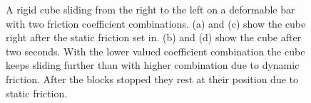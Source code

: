 \begin{figure}[h!]
		\begin{minipage}[b]{0.5 \linewidth}
			\centering
		\end{minipage}
		\begin{minipage}[b]{0.5 \linewidth}
			\centering
		\end{minipage}		
\caption[A rigid cube sliding from the right to the left on a deformable bar with two friction coefficient combinations.]{A rigid cube sliding from the right to the left on a deformable bar with two friction coefficient combinations. (a) and (c) show the cube right after the static friction set in. (b) and (d) show the cube after two seconds. With the lower valued coefficient combination the cube keeps sliding further than with higher combination due to dynamic friction. After the blocks stopped they rest at their position due to static friction.}
\label{fig::block_sliding_fric_longtime}
\end{figure}

